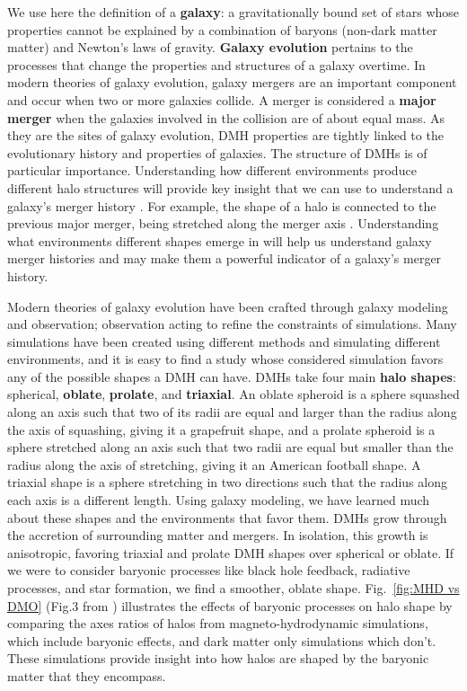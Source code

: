 \documentclass[fleqn,usenatbib]{mnras}
\begin{document}
We use here the \citet{Willman_2012} definition of a \textbf{galaxy}: a gravitationally bound set of stars whose properties cannot be explained by a combination of baryons (non-dark matter matter) and Newton’s laws of gravity. \textbf{Galaxy evolution} pertains to the processes that change the properties and structures of a galaxy overtime. In modern theories of galaxy evolution, galaxy mergers are an important component and occur when two or more galaxies collide. A merger is considered a \textbf{major merger} when the galaxies involved in the collision are of about equal mass. As they are the sites of galaxy evolution, DMH properties are tightly linked to the evolutionary history and properties of galaxies. The structure of DMHs is of particular importance. Understanding how different environments produce different halo structures will provide key insight that we can use to understand a galaxy’s merger history \citep{Drakos_2019}. For example, the shape of a halo is connected to the previous major merger, being stretched along the merger axis \citep{Despali_2016}. Understanding what environments different shapes emerge in will help us understand galaxy merger histories and may make them a powerful indicator of a galaxy's merger history.

Modern theories of galaxy evolution have been crafted through galaxy modeling and observation; observation acting to refine the constraints of simulations. Many simulations have been created using different methods and simulating different environments, and it is easy to find a study whose considered simulation favors any of the possible shapes a DMH can have. DMHs take four main \textbf{halo shapes}: spherical, \textbf{oblate}, \textbf{prolate}, and \textbf{triaxial}. An oblate spheroid is a sphere squashed along an axis such that two of its radii are equal and larger than the radius along the axis of squashing, giving it a grapefruit shape, and a prolate spheroid is a sphere stretched along an axis such that two radii are equal but smaller than the radius along the axis of stretching, giving it an American football shape. A triaxial shape is a sphere stretching in two directions such that the radius along each axis is a different length. Using galaxy modeling, we have learned much about these shapes and the environments that favor them. DMHs grow through the accretion of surrounding matter and mergers.  In isolation, this growth is anisotropic, favoring triaxial and prolate DMH shapes over spherical or oblate. If we were to consider baryonic processes like black hole feedback, radiative processes, and star formation, we find a smoother, oblate shape. Fig.~\ref{fig:MHD vs DMO} (Fig.3 from \citet{Prada_2019}) illustrates the effects of baryonic processes on halo shape by comparing the axes ratios of halos from magneto-hydrodynamic simulations, which include baryonic effects, and dark matter only simulations which don't. These simulations provide insight into how halos are shaped by the baryonic matter that they encompass.
\end{document}
